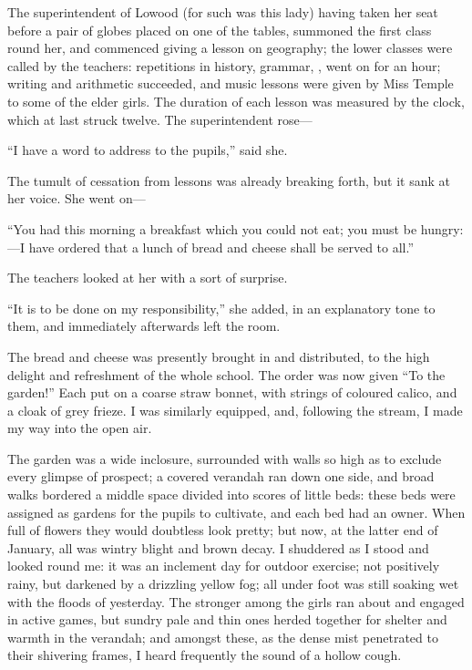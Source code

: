 The superintendent of Lowood (for such was this lady) having taken her
seat before a pair of globes placed on one of the tables, summoned the
first class round her, and commenced giving a lesson on geography; the
lower classes were called by the teachers: repetitions in history,
grammar, \etc, went on for an hour; writing and arithmetic succeeded,
and music lessons were given by Miss Temple to some of the elder girls. 
The duration of each lesson was measured by the clock, which at last
struck twelve. The superintendent rose---

\enquote{I have a word to address to the pupils,} said she.

The tumult of cessation from lessons was already breaking forth, but it
sank at her voice. She went on---

\enquote{You had this morning a breakfast which you could not eat; you
must be hungry:---I have ordered that a lunch of bread and cheese shall
be served to all.}

The teachers looked at her with a sort of surprise.

\enquote{It is to be done on my responsibility,} she added, in an
explanatory tone to them, and immediately afterwards left the room.

The bread and cheese was presently brought in and distributed, to the
high delight and refreshment of the whole school. The order was now
given \enquote{To the garden!} Each put on a coarse straw bonnet, with
strings of coloured calico, and a cloak of grey frieze. I was similarly
equipped, and, following the stream, I made my way into the open air.

The garden was a wide inclosure, surrounded with walls so high as to
exclude every glimpse of prospect; a covered verandah ran down one side,
and broad walks bordered a middle space divided into scores of little
beds: these beds were assigned as gardens for the pupils to cultivate,
and each bed had an owner. When full of flowers they would doubtless
look pretty; but now, at the latter end of January, all was wintry
blight and brown decay. I shuddered as I stood and looked round me: it
was an inclement day for outdoor exercise; not positively rainy, but
darkened by a drizzling yellow fog; all under foot was still soaking wet
with the floods of yesterday. The stronger among the girls ran about
and engaged in active games, but sundry pale and thin ones herded
together for shelter and warmth in the verandah; and amongst these, as
the dense mist penetrated to their shivering frames, I heard frequently
the sound of a hollow cough.

